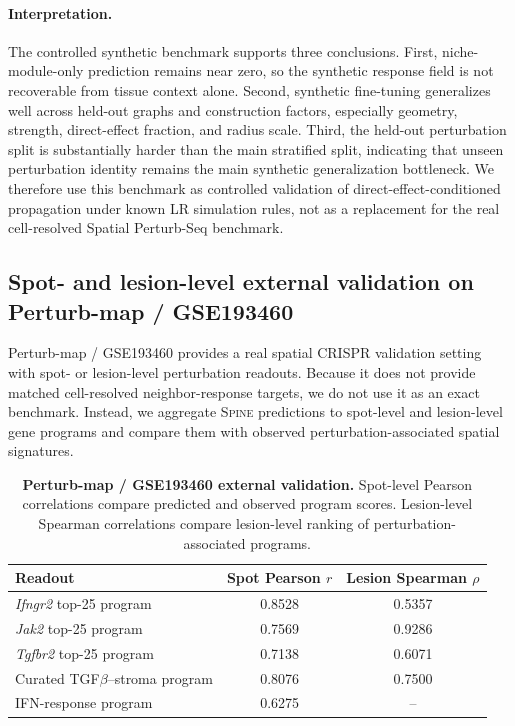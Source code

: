 \documentclass[sigconf,anonymous,review]{acmart}
\newcommand{\methodname}{\textsc{Spine}\xspace}
\begin{document}
\paragraph{Interpretation.}
The controlled synthetic benchmark supports three conclusions. First, niche-module-only
prediction remains near zero, so the synthetic response field is not recoverable from
tissue context alone. Second, synthetic fine-tuning generalizes well across held-out
graphs and construction factors, especially geometry, strength, direct-effect fraction, and
radius scale. Third, the held-out perturbation split is substantially harder than the
main stratified split, indicating that unseen perturbation identity remains the main
synthetic generalization bottleneck. We therefore use this benchmark as controlled
validation of direct-effect-conditioned propagation under known LR simulation rules, not as
a replacement for the real cell-resolved Spatial Perturb-Seq benchmark.

\subsection{Spot- and lesion-level external validation on Perturb-map / GSE193460}
\label{app:perturbmap_validation}

Perturb-map / GSE193460 provides a real spatial CRISPR validation setting with
spot- or lesion-level perturbation readouts. Because it does not provide matched
cell-resolved neighbor-response targets, we do not use it as an exact benchmark.
Instead, we aggregate \methodname{} predictions to spot-level and lesion-level gene
programs and compare them with observed perturbation-associated spatial signatures.

\begin{table}[t]
\centering
\small
\setlength{\tabcolsep}{4pt}
\renewcommand{\arraystretch}{1.08}
\caption{\textbf{Perturb-map / GSE193460 external validation.}
Spot-level Pearson correlations compare predicted and observed program scores.
Lesion-level Spearman correlations compare lesion-level ranking of perturbation-associated
programs.}
\label{tab:perturbmap_external}
\begin{tabular}{lcc}
\toprule
Readout & Spot Pearson $r$ & Lesion Spearman $\rho$ \\
\midrule
\textit{Ifngr2} top-25 program & 0.8528 & 0.5357 \\
\textit{Jak2} top-25 program & 0.7569 & 0.9286 \\
\textit{Tgfbr2} top-25 program & 0.7138 & 0.6071 \\
Curated TGF$\beta$--stroma program & 0.8076 & 0.7500 \\
IFN-response program & 0.6275 & -- \\
\bottomrule
\end{tabular}
\end{table}
\end{document}
